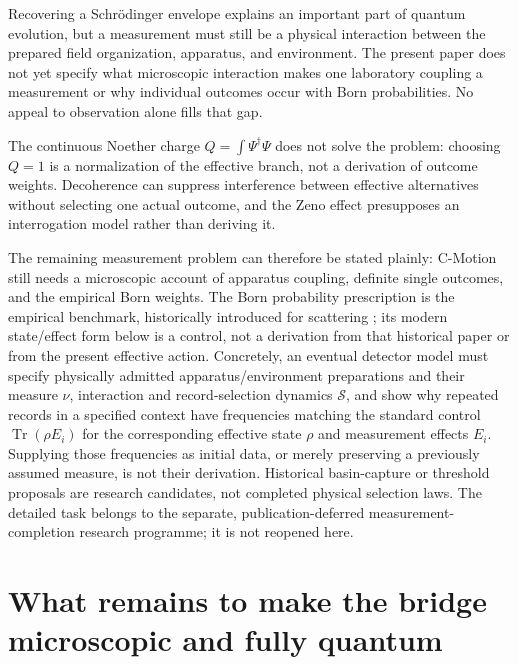 \documentclass[11pt]{article}
\theoremstyle{definition}
\begin{document}
Recovering a Schrödinger envelope explains an important part of quantum evolution, but a
measurement must still be a physical interaction between the prepared field organization,
apparatus, and environment.  The present paper does not yet specify what microscopic
interaction makes one laboratory coupling a measurement or why individual outcomes occur with
Born probabilities.  No appeal to observation alone fills that gap.

The continuous Noether charge $Q=\int\Psi^\dagger\Psi$ does not solve the problem: choosing
$Q=1$ is a normalization of the effective branch, not a derivation of outcome weights.
Decoherence can suppress interference between effective alternatives without selecting one
actual outcome, and the Zeno effect presupposes an interrogation model rather than deriving it.

The remaining measurement problem can therefore be stated plainly: C-Motion still needs a
microscopic account of apparatus coupling, definite single outcomes, and the empirical Born
weights. The Born probability prescription is the empirical benchmark,
historically introduced for scattering \cite{Born1926}; its modern
state/effect form below is a control, not a derivation from that historical
paper or from the present effective action. Concretely, an eventual detector model must specify physically admitted
apparatus/environment preparations and their measure $\nu$, interaction and
record-selection dynamics $\mathcal S$, and show why repeated records in a
specified context have frequencies matching the standard control
$\operatorname{Tr}(\rho E_i)$ for the corresponding effective state $\rho$
and measurement effects $E_i$.  Supplying those frequencies as initial data, or
merely preserving a previously assumed measure, is not their derivation.
Historical basin-capture or threshold proposals are research candidates, not
completed physical selection laws.  The detailed task belongs to the separate,
publication-deferred measurement-completion research programme; it is not reopened here.

\section{What remains to make the bridge microscopic and fully quantum}
\label{sec:open}
\end{document}
